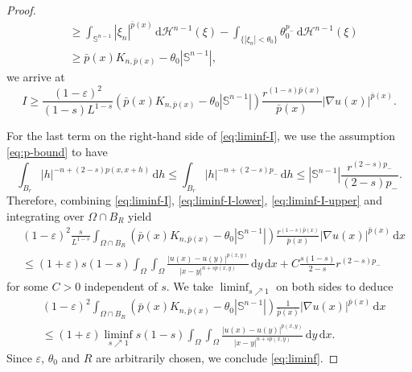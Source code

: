 \documentclass[11pt]{amsart}
\theoremstyle{plain}
\theoremstyle{definition}
\numberwithin{equation}{section}
\begin{document}
\begin{proof}
\begin{equation*}
\begin{split}
&\geq \int_{\mathbb{S}^{n-1}} |\xi_{n}|^{\bar{p}(x)} \,\mathrm{d}\mathcal{H}^{n-1}(\xi) - \int_{\lbrace |\xi_{n}| < \theta_{0} \rbrace} \theta_{0}^{p_{-}} \,\mathrm{d}\mathcal{H}^{n-1}(\xi) \\
&\geq \bar{p}(x) K_{n, \bar{p}(x)} - \theta_{0} |\mathbb{S}^{n-1}|,
\end{split}
\end{equation*}
we arrive at
\begin{equation} \label{eq:liminf-I-lower}
I \geq \frac{(1-\varepsilon)^2}{(1-s)L^{1-s}} \left( \bar{p}(x) K_{n, \bar{p}(x)} - \theta_0 |\mathbb{S}^{n-1}| \right) \frac{r^{(1-s)\bar{p}(x)}}{\bar{p}(x)} |\nabla u(x)|^{\bar{p}(x)}.
\end{equation}

For the last term on the right-hand side of \eqref{eq:liminf-I}, we use the assumption \eqref{eq:p-bound} to have
\begin{equation} \label{eq:liminf-I-upper}
\int_{B_{r}} |h|^{-n+(2-s)p(x, x+h)} \,\mathrm{d}h \leq \int_{B_{r}} |h|^{-n+(2-s)p_{-}} \,\mathrm{d}h \leq |\mathbb{S}^{n-1}| \frac{r^{(2-s)p_{-}}}{(2-s)p_{-}}.
\end{equation}
Therefore, combining \eqref{eq:liminf-I}, \eqref{eq:liminf-I-lower}, \eqref{eq:liminf-I-upper} and integrating over $\Omega \cap B_{R}$ yield
\begin{equation*}
\begin{split}
&(1-\varepsilon)^{2} \frac{s}{L^{1-s}} \int_{\Omega \cap B_{R}} \left( \bar{p}(x) K_{n, \bar{p}(x)} - \theta_{0} |\mathbb{S}^{n-1}| \right) \frac{r^{(1-s)\bar{p}(x)}}{\bar{p}(x)} |\nabla u(x)|^{\bar{p}(x)} \,\mathrm{d}x \\
&\leq (1+\varepsilon) s(1-s) \int_{\Omega} \int_{\Omega} \frac{|u(x)-u(y)|^{p(x, y)}}{|x-y|^{n+sp(x, y)}} \,\mathrm{d}y \,\mathrm{d}x + C \frac{s(1-s)}{2-s} r^{(2-s)p_{-}}
\end{split}
\end{equation*}
for some $C > 0$ independent of $s$. We take $\liminf_{s \nearrow 1}$ on both sides to deduce
\begin{equation*}
\begin{split}
&(1-\varepsilon)^{2} \int_{\Omega \cap B_{R}} \left( \bar{p}(x) K_{n, \bar{p}(x)} - \theta_{0} |\mathbb{S}^{n-1}| \right) \frac{1}{\bar{p}(x)} |\nabla u(x)|^{\bar{p}(x)} \,\mathrm{d}x \\
&\leq (1+\varepsilon) \liminf_{s \nearrow 1} s(1-s) \int_{\Omega} \int_{\Omega} \frac{|u(x)-u(y)|^{p(x, y)}}{|x-y|^{n+sp(x, y)}} \,\mathrm{d}y \,\mathrm{d}x.
\end{split}
\end{equation*}
Since $\varepsilon$, $\theta_0$ and $R$ are arbitrarily chosen, we conclude \eqref{eq:liminf}.
\end{proof}
\end{document}

